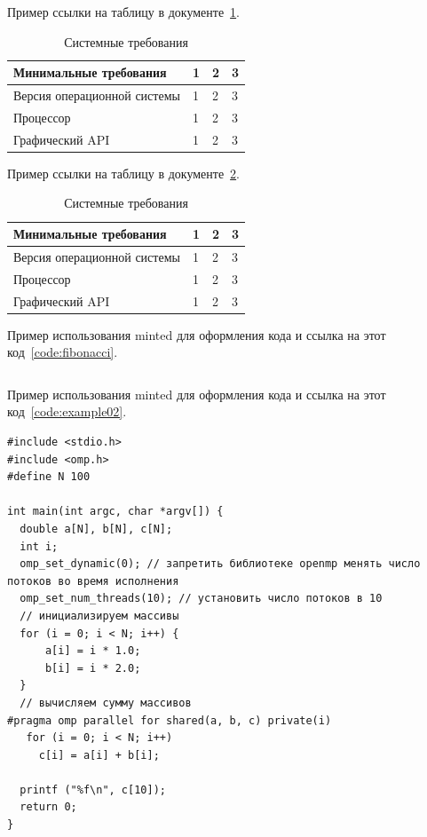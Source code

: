 Пример ссылки на таблицу в документе~\ref{tab:example01}.
\begin{table}[H]
\caption{\centering\label{tab:example01}Системные требования}
\begin{tabular}{|p{3 cm}|p{3 cm}|p{3 cm}|p{5 cm}|}
\hline
Минимальные требования & 1 & 2 & 3 \\ \hline
Версия операционной системы & 1 & 2 & 3 \\ \hline
Процессор & 1 & 2 & 3 \\ \hline
Графический API & 1 & 2 & 3 \\ \hline
\end{tabular}
\end{table}

Пример ссылки на таблицу в документе~\ref{tab:example02}.
\begin{table}[H]
\caption{\centering\label{tab:example02}Системные требования}
\begin{tabular}{|p{3 cm}|p{3 cm}|p{3 cm}|p{5 cm}|}
\hline
Минимальные требования & 1 & 2 & 3 \\ \hline
Версия операционной системы & 1 & 2 & 3 \\ \hline
Процессор & 1 & 2 & 3 \\ \hline
Графический API & 1 & 2 & 3 \\ \hline
\end{tabular}
\end{table}

Пример использования minted для оформления кода и ссылка на этот код~\ref{code:fibonacci}.
\begin{code}
\vspace{-\baselineskip}\inputminted{python}{src/fibonacci.py}
\end{code}

Пример использования minted для оформления кода и ссылка на этот код~\ref{code:example02}.
\begin{code}
\vspace{-\baselineskip}\begin{verbatim}
#include <stdio.h>
#include <omp.h>
#define N 100

int main(int argc, char *argv[]) {
  double a[N], b[N], c[N];
  int i;
  omp_set_dynamic(0); // запретить библиотеке openmp менять число потоков во время исполнения
  omp_set_num_threads(10); // установить число потоков в 10
  // инициализируем массивы
  for (i = 0; i < N; i++) {
      a[i] = i * 1.0;
      b[i] = i * 2.0;
  }
  // вычисляем сумму массивов
#pragma omp parallel for shared(a, b, c) private(i)
   for (i = 0; i < N; i++)
     c[i] = a[i] + b[i];

  printf ("%f\n", c[10]);
  return 0;
}
\end{verbatim}
\end{code}

